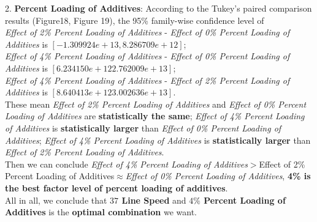 \documentclass[11pt,a4paper]{article}
\begin{document}
2. \textbf{Percent Loading of Additives}: According to the Tukey’s paired comparison results (Figure18, Figure 19), the 95\% family-wise confidence level of\\
\textit{Effect of 2\% Percent Loading of Additives} - \textit{Effect of 0\% Percent Loading of Additives} is $[-1.309924e+13, 8.286709e+12]$;\\
\textit{Effect of 4\% Percent Loading of Additives} - \textit{Effect of 0\% Percent Loading of Additives} is $[6.234150e+12 2.762009e+13]$;\\
\textit{Effect of 4\% Percent Loading of Additives} - \textit{Effect of 2\% Percent Loading of Additives} is $[8.640413e+12 3.002636e+13]$.\\
These mean \textit{Effect of 2\% Percent Loading of Additives} and \textit{Effect of 0\% Percent Loading of Additives} are \textbf{statistically the same}; \textit{Effect of 4\% Percent Loading of Additives}  is \textbf{statistically larger} than \textit{Effect of 0\% Percent Loading of Additives}; \textit{Effect of 4\% Percent Loading of Additives} is \textbf{statistically larger} than \textit{Effect of 2\% Percent Loading of Additives}.\\
Then we can conclude \textit{Effect of 4\% Percent Loading of Additives}$>${Effect of 2\% Percent Loading of Additives}$\approx$\textit{Effect of 0\% Percent Loading of Additives}, \textbf{4\% is the best factor level of percent loading of additives}.\\

All in all, we conclude that \textbf{$37$ Line Speed} and \textbf{$4\%$ Percent Loading of Additives} is the \textbf{optimal combination} we want.
\end{document}
